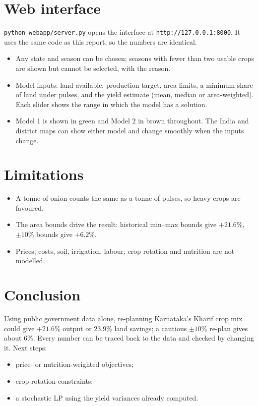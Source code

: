 \documentclass[11pt,a4paper]{article}
\begin{document}
\section{Web interface}
\texttt{python webapp/server.py} opens the interface at \texttt{http://127.0.0.1:8000}. It uses
the same code as this report, so the numbers are identical.
\begin{itemize}
  \item Any state and season can be chosen; seasons with fewer than two usable crops are shown
        but cannot be selected, with the reason.
  \item Model inputs: land available, production target, area limits, a minimum share of land
        under pulses, and the yield estimate (mean, median or area-weighted). Each slider shows
        the range in which the model has a solution.
  \item Model 1 is shown in green and Model 2 in brown throughout. The India and district maps
        can show either model and change smoothly when the inputs change.
\end{itemize}

\section{Limitations}
\begin{itemize}
  \item A tonne of onion counts the same as a tonne of pulses, so heavy crops are favoured.
  \item The area bounds drive the result: historical min--max bounds give $+21.6\%$,
        $\pm10\%$ bounds give $+6.2\%$.
  \item Prices, costs, soil, irrigation, labour, crop rotation and nutrition are not modelled.
\end{itemize}

\section{Conclusion}
Using public government data alone, re-planning Karnataka's Kharif crop mix could give
$+21.6\%$ output or $23.9\%$ land savings; a cautious $\pm10\%$ re-plan gives about 6\%.
Every number can be traced back to the data and checked by changing it. Next steps:
\begin{itemize}
  \item price- or nutrition-weighted objectives;
  \item crop rotation constraints;
  \item a stochastic LP using the yield variances already computed.
\end{itemize}
\end{document}
